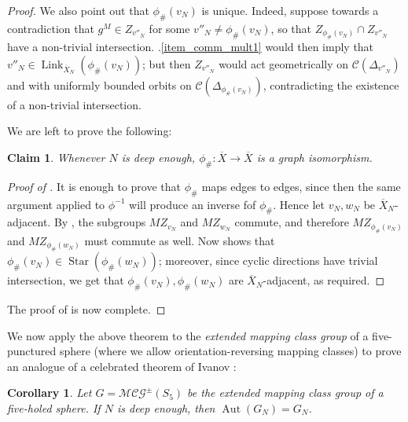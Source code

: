 \documentclass[svgnames]{amsart}
\theoremstyle{plain}
\newtheorem{cor}[thm]{Corollary}
\newtheorem{claim}[thm]{Claim}
\newenvironment{claimproof}{\renewcommand{\qedsymbol}{$\blacksquare$}\begin{proof}}{\end{proof}}
\theoremstyle{definition}
\newcommand{\C}[1]{\mathcal{C}(#1)}
\newcommand{\link}[2]{\operatorname{Link}_{#1}\left(#2\right)}
\newcommand{\CStar}[1]{\operatorname{Star}\left(#1\right)}
\newcommand{\MCG}{\mathcal{MCG}}
\newcommand{\Aut}[1]{\operatorname{Aut}\left(#1\right)}
\newcommand{\ov}[1]{\overline{#1}}
\begin{document}
\begin{proof}
We also point out that $\phi_{\#}(v_N)$ is unique. Indeed, suppose towards a contradiction that $g^{M}\in Z_{v''_N}$ for some $v''_N\neq \phi_{\#}(v_N)$, so that $Z_{\phi_{\#}(v_N)}\cap Z_{v''_N}$ have a non-trivial intersection. .\eqref{item_comm_mult1} would then imply that $v''_N\in\link{\ov X_N}{ \phi_{\#}(v_N)}$; but then $Z_{v''_N}$ would act geometrically on $\C{\Delta_{v''_N}}$ and with uniformly bounded orbits on $\C{\Delta_{\phi_{\#}(v_N)}}$, contradicting the existence of a non-trivial intersection.

We are left to prove the following:
\begin{claim}\label{claim:graphiso}
    Whenever $N$ is deep enough, $\phi_{\#}\colon \ov X\to \ov X$ is a graph isomorphism.
\end{claim}
\begin{claimproof}[Proof of ] It is enough to prove that $\phi_{\#}$ maps edges to edges, since then the same argument applied to $\phi^{-1}$ will produce an inverse fof $\phi_{\#}$. Hence let $v_N, w_N$ be $\ov X_N$-adjacent. By  , the subgroups $MZ_{v_N}$ and $MZ_{w_N}$ commute, and therefore $MZ_{\phi_\#(v_N)}$ and $MZ_{\phi_\#(w_N)}$ must commute as well. Now  shows that $\phi_\#(v_N)\in\CStar{\phi_\#(w_N)} $; moreover, since cyclic directions have trivial intersection, we get that $\phi_\#(v_N),\phi_\#(w_N)$ are $\ov X_N$-adjacent, as required.
\end{claimproof}
\noindent The proof of  is now complete.
\end{proof}

\noindent We now apply the above theorem to the \emph{extended mapping class group} of a five-punctured sphere (where we allow orientation-reversing mapping classes) to prove an analogue of a celebrated theorem of Ivanov \cite{Ivanov:autC}:
\begin{cor}\label{cor:autmcgs5}
    Let $G=\MCG^\pm(S_5)$ be the extended mapping class group of a five-holed sphere. If $N$ is deep enough, then $\Aut{G_N}=G_N$.
\end{cor}
\end{document}

